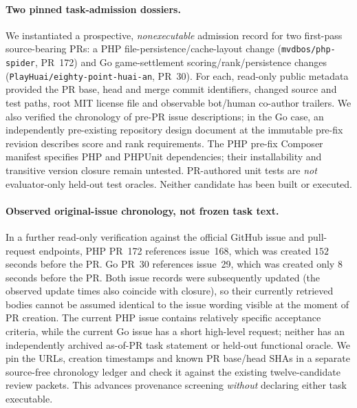 \documentclass[pdflatex,sn-basic]{sn-jnl}
\begin{document}
\paragraph{Two pinned task-admission dossiers.}
We instantiated a prospective, \emph{nonexecutable}
admission record for two first-pass source-bearing PRs:
a PHP file-persistence/cache-layout change
(\texttt{mvdbos/php-spider}, PR~172) and Go game-settlement
scoring/rank/persistence changes
(\texttt{PlayHuai/eighty-point-huai-an}, PR~30).
For each, read-only public metadata provided the PR
base, head and merge commit identifiers, changed source
and test paths, root MIT license file and observable
bot/human co-author trailers. We also verified the
chronology of pre-PR issue descriptions; in the Go
case, an independently pre-existing repository design
document at the immutable pre-fix revision describes
score and rank requirements. The PHP pre-fix Composer
manifest specifies PHP and PHPUnit dependencies;
their installability and transitive version closure
remain untested. PR-authored unit tests are
\emph{not} evaluator-only held-out test oracles.
Neither candidate has been built or executed.

\paragraph{Observed original-issue chronology, not frozen task text.}
In a further read-only verification against the official
GitHub issue and pull-request endpoints, PHP
PR~172 references issue~168, which was created
$152$ seconds before the PR. Go PR~30 references
issue~29, which was created only $8$ seconds
before the PR. Both issue records were subsequently
updated (the observed update times also coincide
with closure), so their currently retrieved bodies
cannot be assumed identical to the issue wording
visible at the moment of PR creation. The current
PHP issue contains relatively specific acceptance
criteria, while the current Go issue has a short
high-level request; neither has an independently
archived as-of-PR task statement or held-out
functional oracle. We pin the URLs, creation
timestamps and known PR base/head SHAs in a
separate source-free chronology ledger and check
it against the existing twelve-candidate review
packets. This advances provenance screening
\emph{without} declaring either task executable.
\end{document}

